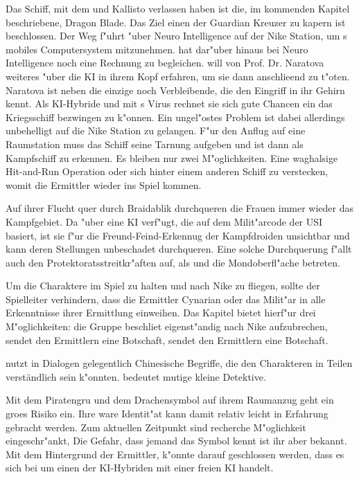 \begin{remarks}
	Das Schiff, mit dem \xl{} und \ml{} Kallisto verlassen haben ist die, im kommenden Kapitel beschriebene, Dragon Blade. Das Ziel einen der Guardian Kreuzer zu kapern ist beschlossen. Der Weg f"uhrt "uber Neuro Intelligence auf der Nike Station, um \ml{}s mobiles Computersystem mitzunehmen. \xl{} hat dar"uber hinaus bei Neuro Intelligence noch eine Rechnung zu begleichen. \xl{} will von Prof. Dr. Naratova weiteres "uber die KI in ihrem Kopf erfahren, um sie dann anschlie\3end zu t"oten. Naratova ist neben \ml{} die einzige noch Verbleibende, die den Eingriff in ihr Gehirn kennt. Als KI-Hybride und mit \ml{}s Virus rechnet sie sich gute Chancen ein das Kriegsschiff bezwingen zu k"onnen. Ein ungel"ostes Problem ist dabei allerdings unbehelligt auf die Nike Station zu gelangen. F"ur den Anflug auf eine Raumstation muss das Schiff seine Tarnung aufgeben und ist dann als Kampfschiff zu erkennen. Es bleiben nur zwei M"oglichkeiten. Eine waghalsige Hit-and-Run Operation oder sich hinter einem anderen Schiff zu verstecken, womit die Ermittler wieder ins Spiel kommen.

	Auf ihrer Flucht quer durch Braidablik durchqueren die Frauen immer wieder das Kampfgebiet. Da \xl{} "uber eine KI verf"ugt, die auf dem Milit"arcode der USI basiert, ist sie f"ur die Freund-Feind-Erkennug der Kampfdroiden unsichtbar und kann deren Stellungen unbeschadet durchqueren. Eine solche Durchquerung f"allt auch den Protektoratsstreitkr"aften auf, als \xl{} und \ml{} die Mondoberfl"ache betreten. 

	Um die Charaktere im Spiel zu halten und nach Nike zu fliegen, sollte der Spielleiter verhindern, dass die Ermittler Cynarian oder das Milit"ar in alle Erkenntnisse ihrer Ermittlung einweihen. Das Kapitel bietet hierf"ur drei M"oglichkeiten: die Gruppe beschlie\3t eigenst"andig nach Nike aufzubrechen, \xl{} sendet den Ermittlern eine Botschaft, \ml{} sendet den Ermittlern eine Botschaft.

	\xl{} nutzt in Dialogen gelegentlich Chinesische Begriffe, die den Charakteren in Teilen verständlich sein k"onnten. 
	 bedeutet mutige kleine Detektive.

	Mit dem Piratengru\3 und dem Drachensymbol auf ihrem Raumanzug geht \xl{} ein gro\3es Risiko ein. Ihre ware Identit"at kann damit relativ leicht in Erfahrung gebracht werden. Zum aktuellen Zeitpunkt sind recherche M"oglichkeit eingeschr"ankt, Die Gefahr, dass jemand das Symbol kennt ist ihr aber bekannt. Mit dem Hintergrund der Ermittler, k"onnte darauf geschlossen werden, dass es sich bei \xl{} um einen der KI-Hybriden mit einer freien KI handelt.
\end{remarks}
